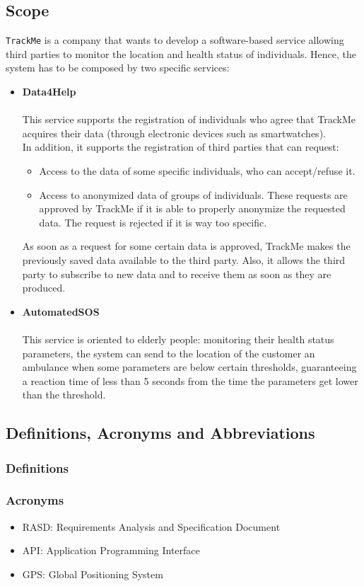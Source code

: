 \documentclass[12pt,a4paper]{article}
\begin{document}
		\subsection{Scope}
		\texttt{TrackMe} is a company that wants to develop a software-based service allowing third parties to monitor the location and health status of individuals.
		Hence, the system has to be composed by two specific services:
		\begin{itemize}
			\item \textbf{Data4Help}\\\\This service supports the registration of individuals who agree that TrackMe acquires their data (through electronic devices such as smartwatches). \\In addition, it supports the registration of third parties that can request:
				\begin{itemize}
					\item Access to the data of some specific individuals, who can accept/refuse it.
					\item Access to anonymized data of groups of individuals. These requests are approved by TrackMe if it is able to properly anonymize the requested data. The request is rejected if it is way too specific.
				\end{itemize}
		As soon as a request for some certain data is approved, TrackMe makes the previously saved data available to the third party. Also, it allows the third party to subscribe to new data and to receive them as soon as they are produced.
			\item \textbf{AutomatedSOS}\\\\This service is oriented to elderly people: monitoring their health status parameters, the system can send to the location of the customer an ambulance when some parameters are below certain thresholds, guaranteeing a reaction time of less than 5 seconds from the time the parameters get lower than the threshold.
		\end{itemize} 
	
	
		\subsection{Definitions, Acronyms and Abbreviations}
			\subsubsection{Definitions}
			\subsubsection{Acronyms}
				\begin{itemize}
				\item RASD: Requirements Analysis and Specification Document
				\item API: Application Programming Interface
				\item GPS: Global Positioning System
				\end{itemize}
\end{document}
